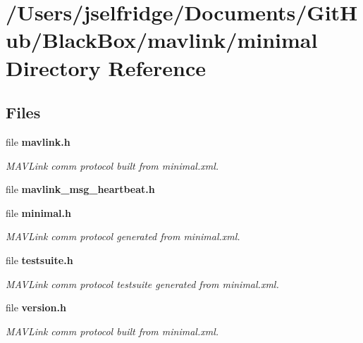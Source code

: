 \section{/\+Users/jselfridge/\+Documents/\+Git\+Hub/\+Black\+Box/mavlink/minimal Directory Reference}
\label{dir_245976c6e13ae92c3f4e29bd62553b1b}
\subsection*{Files}
\begin{DoxyCompactItemize}
\item 
file \textbf{ mavlink.\+h}
\begin{DoxyCompactList}\small\item\em M\+A\+V\+Link comm protocol built from minimal.\+xml. \end{DoxyCompactList}\item 
file \textbf{ mavlink\+\_\+msg\+\_\+heartbeat.\+h}
\item 
file \textbf{ minimal.\+h}
\begin{DoxyCompactList}\small\item\em M\+A\+V\+Link comm protocol generated from minimal.\+xml. \end{DoxyCompactList}\item 
file \textbf{ testsuite.\+h}
\begin{DoxyCompactList}\small\item\em M\+A\+V\+Link comm protocol testsuite generated from minimal.\+xml. \end{DoxyCompactList}\item 
file \textbf{ version.\+h}
\begin{DoxyCompactList}\small\item\em M\+A\+V\+Link comm protocol built from minimal.\+xml. \end{DoxyCompactList}\end{DoxyCompactItemize}
